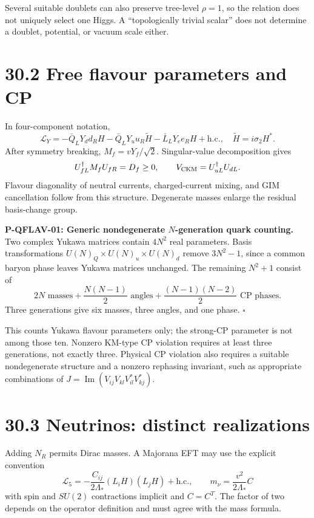 \documentclass[
  11pt,
  oneside]{book}
\begin{document}
Several suitable doublets can also preserve tree-level \(\rho=1\), so
the relation does not uniquely select one Higgs. A ``topologically
trivial scalar'' does not determine a doublet, potential, or vacuum
scale either.

\section{30.2 Free flavour parameters and CP}

In four-component notation, \[
\mathcal L_Y=-\bar Q_LY_dd_RH-\bar Q_LY_uu_R\widetilde H
-\bar L_LY_ee_RH+\mathrm{h.c.},\quad \widetilde H=i\sigma_2H^*.
\] After symmetry breaking, \(M_f=vY_f/\sqrt2\). Singular-value
decomposition gives \[
U_{fL}^\dagger M_fU_{fR}=D_f\ge0,\qquad
V_{\rm CKM}=U_{uL}^\dagger U_{dL}.
\] Flavour diagonality of neutral currents, charged-current mixing, and
GIM cancellation follow from this structure. Degenerate masses enlarge
the residual basis-change group.

\label{p-qflav-01}{}

\textbf{P-QFLAV-01: Generic nondegenerate \(N\)-generation quark
counting.} Two complex Yukawa matrices contain \(4N^2\) real parameters.
Basis transformations \(U(N)_Q\times U(N)_u\times U(N)_d\) remove
\(3N^2-1\), since a common baryon phase leaves Yukawa matrices
unchanged. The remaining \(N^2+1\) consist of \[
2N\text{ masses}+\frac{N(N-1)}2\text{ angles}
+\frac{(N-1)(N-2)}2\text{ CP phases}.
\] Three generations give six masses, three angles, and one phase.
\(\square\)

This counts Yukawa flavour parameters only; the strong-CP parameter is
not among those ten. Nonzero KM-type CP violation requires at least
three generations, not exactly three. Physical CP violation also
requires a suitable nondegenerate structure and a nonzero rephasing
invariant, such as appropriate combinations of
\(J=\operatorname{Im}(V_{ij}V_{kl}V^*_{il}V^*_{kj})\).

\section{30.3 Neutrinos: distinct realizations}

Adding \(N_R\) permits Dirac masses. A Majorana EFT may use the explicit
convention \[
\mathcal L_5=-\frac{C_{ij}}{2\Lambda_*}(L_iH)(L_jH)+\mathrm{h.c.},
\qquad m_\nu=\frac{v^2}{2\Lambda_*}C
\] with spin and \(SU(2)\) contractions implicit and \(C=C^T\). The
factor of two depends on the operator definition and must agree with the
mass formula.
\end{document}
